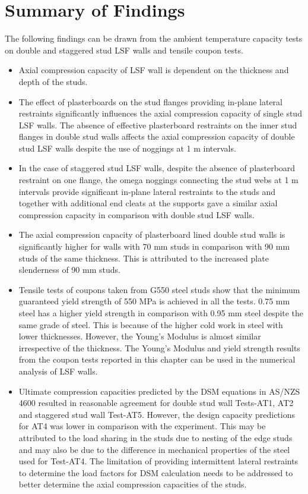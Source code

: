 \section{Summary of Findings}

The following findings can be drawn from the ambient temperature capacity tests on double and staggered stud LSF walls and tensile coupon tests.
\begin{itemize}
	\item Axial compression capacity of LSF wall is dependent on the thickness and depth of the studs.
	\item The effect of plasterboards on the stud flanges providing in-plane lateral restraints significantly influences the axial compression capacity of single stud LSF walls. The absence of effective plasterboard restraints on the inner stud flanges in double stud walls affects the axial compression capacity of double stud LSF walls despite the use of noggings at 1 m intervals.
	\item In the case of staggered stud LSF walls, despite the absence of plasterboard restraint on one flange, the omega noggings connecting the stud webs at 1 m intervals provide significant in-plane lateral restraints to the studs and together with additional end cleats at the supports gave a similar axial compression capacity in comparison with double stud LSF walls.
	\item The axial compression capacity of plasterboard lined double stud walls is significantly higher for walls with 70 mm studs in comparison with 90 mm studs of the same thickness. This is attributed to the increased plate slenderness of 90 mm studs. 
	\item Tensile tests of coupons taken from G550 steel studs show that the minimum guaranteed yield strength of 550 MPa is achieved in all the tests. 0.75 mm steel has a higher yield strength in comparison with 0.95 mm steel despite the same grade of steel. This is because of the higher cold work in steel with lower thicknesses. However, the Young's Modulus is almost similar irrespective of the thickness. The Young's Modulus and yield strength results from the coupon tests reported in this chapter can be used in the numerical analysis of LSF walls. 
	\item Ultimate compression capacities predicted by the DSM equations in AS/NZS 4600 resulted in reasonable agreement for double stud wall Tests-AT1, AT2 and staggered stud wall Test-AT5. However, the design capacity predictions for AT4 was lower in comparison with the experiment. This may be attributed to the load sharing in the studs due to nesting of the edge studs and may also be due to the difference in mechanical properties of the steel used for Test-AT4. The limitation of providing intermittent lateral restraints to determine the load factors for DSM calculation needs to be addressed to better determine the axial compression capacities of the studs. 
\end{itemize}
  
  
  
